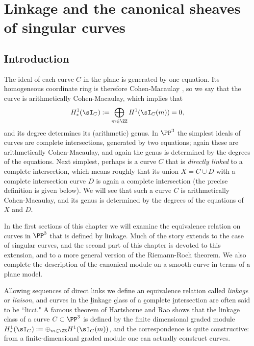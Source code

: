 

\chapter{Linkage and the canonical sheaves of singular curves}
\label{LiaisonChapter}\label{linkageChapter}\label{LinkageChapter}


\section{Introduction} \label{LinkageIntro}


The ideal of each curve $C$ in the plane is generated by one equation. Its homogeneous coordinate ring
is therefore Cohen-Macaulay \cite[Propositions 18.8, 18.13]{Eisenbud1995}, so we say that the curve is arithmetically Cohen-Macaulay, 
which implies that 
$$
H^1_*(\sI_C) := \bigoplus_{m\in \ZZ}H^1(\sI_C(m)) = 0,
$$
 and its degree determines its (arithmetic) genus. In $\PP^3$ the simplest ideals of curves are
complete intersections, generated by two equations; again these are arithmetically Cohen-Macaulay, and again the genus is determined by the degrees of the equations.
 Next simplest, perhaps
is a curve $C$ that is \emph{directly linked} to a complete intersection, which means roughly that its union $X = C\cup D$
with a complete intersection
curve $D$ is again a complete intersection (the precise definition is given below). We will see that such a curve $C$ is arithmetically Cohen-Macaulay,
and its genus is determined by the degrees of the equations of $X$ and $D$. 

In the first sections of this chapter we will examine the equivalence relation on curves in $\PP^3$ that is defined by linkage. Much of the story extends to the case of singular curves, and the second part of this chapter is devoted to this extension, and to a more general version of the Riemann-Roch theorem. We also complete the description of the canonical module on a smooth curve
in terms of a plane model.

Allowing sequences of direct links we define an equivalence relation called  \emph{linkage} or \emph{liaison}, 
and curves in the {\underline l}inkage {\underline c}lass of a {\underline c}omplete {\underline i}ntersection are often said to be ``licci." 
A famous theorem of Hartshorne and Rao \cite{MR520926} shows that the linkage class of a curve $C\subset \PP^3$
is defined by the finite dimensional graded module $H^1_*(\sI_C):=\oplus_{m\in \ZZ} H^1(\sI_C(m))$,
and the correspondence is quite constructive: from a finite-dimensional graded module one can
actually construct curves.

